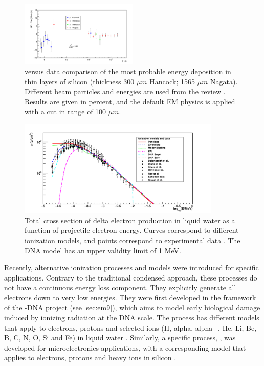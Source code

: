 \begin{figure}
\includegraphics[width=0.5\textwidth]{figures/BetaGamma_Delta_diff_opt0_10um.pdf}
\caption{\Gfour{} versus data comparison of the most probable energy deposition in 
         thin layers of silicon (thickness 300 $\mu m$ Hancock; 1565 $\mu m$ Nagata). 
         Different beam particles and energies are used from the review
         \cite{embib:bicsel}.  Results are given in percent, and the default EM 
         physics is applied with a cut in range of 100 $\mu m$.}
\label{em:silicon}
\end{figure}

\begin{figure}
\includegraphics[width=3.8in]{figures/ApicXS_99.pdf}
\caption{Total cross section of delta electron production in liquid water as a
         function of projectile electron energy.  Curves correspond to different
         \Gfour{} ionization models, and points correspond to experimental data
         \cite{embib:dnaxs}.  The DNA model has an upper validity limit of
         1 MeV.}
\label{em:xsh2o}
\end{figure}

Recently, alternative ionization processes and models were introduced for
specific applications.  Contrary to the traditional condensed approach, these 
processes do not have a continuous energy loss component.  They explicitly 
generate all electrons down to very low energies.  They were first developed in
the framework of the \Gfour{}-DNA project (see \ref{sec:em9}), which aims to model
early biological damage induced by ionizing radiation at the DNA scale.  The 
 process has different models that apply to electrons, 
protons and selected ions (H, alpha, alpha+, He, Li, Be, B, C, N, O, Si and Fe)
in liquid water \cite{embib:dnaProc1, embib:dnaxs}.  Similarly, a specific
process, , was developed for microelectronics 
applications, with a corresponding model that applies to electrons, protons and
heavy ions in silicon \cite{embib:micro, embib:micro1}.


